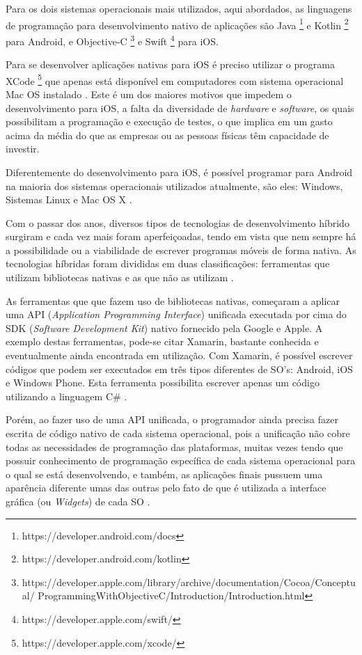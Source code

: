 Para os dois sistemas operacionais mais utilizados, aqui abordados, as linguagens de programação para desenvolvimento nativo de aplicações  são Java \footnote{https://developer.android.com/docs} e Kotlin \footnote{https://developer.android.com/kotlin} para Android, e Objective-C \footnote{https://developer.apple.com/library/archive/documentation/Cocoa/Conceptual/ \newline ProgrammingWithObjectiveC/Introduction/Introduction.html} e Swift \footnote{https://developer.apple.com/swift/} para iOS. 

Para se desenvolver aplicações nativas para iOS é preciso utilizar o programa XCode \footnote{https://developer.apple.com/xcode/} que apenas está disponível em computadores com sistema operacional Mac OS instalado \cite{goadrich2011smart}. Este é um dos maiores motivos que impedem o desenvolvimento para iOS, a falta da diversidade de \textit{hardware} e \textit{software}, os quais possibilitam a programação e execução de testes, o que implica em um gasto acima da média do que as empresas ou as pessoas físicas têm capacidade de investir.

Diferentemente do desenvolvimento para iOS, é possível programar para Android na maioria dos sistemas operacionais utilizados atualmente, são eles: Windows, Sistemas Linux e Mac OS X \cite{goadrich2011smart}. 

Com o passar dos anos, diversos tipos de tecnologias de desenvolvimento híbrido surgiram e cada vez mais foram aperfeiçoadas, tendo em vista que nem sempre há a possibilidade ou a viabilidade de escrever programas móveis de forma nativa.
As tecnologias híbridas foram divididas em duas classificações: ferramentas que utilizam bibliotecas nativas e as que não as utilizam \cite{clow2019flutter}.

As ferramentas que que fazem uso de bibliotecas nativas, começaram a aplicar uma API (\textit{Application Programming Interface}) unificada executada por cima do SDK (\textit{Software Development Kit}) nativo fornecido pela Google e Apple. A exemplo destas ferramentas, pode-se citar Xamarin, bastante conhecida e eventualmente ainda encontrada em utilização. Com Xamarin, é possível escrever códigos que podem ser executados em três tipos diferentes de SO's: Android, iOS e Windows Phone. Esta ferramenta possibilita escrever apenas um código utilizando a linguagem C\# \cite{petzold2015xamarin}.

Porém, ao fazer uso de uma API unificada, o programador ainda precisa fazer escrita de código nativo de cada sistema operacional, pois a unificação não cobre todas as necessidades de programação das plataformas, muitas vezes tendo que possuir conhecimento de programação específica de cada sistema operacional para o qual se está desenvolvendo, e também, as aplicações finais pussuem uma aparência diferente umas das outras pelo fato de que é utilizada a interface gráfica (ou \textit{Widgets}) de cada SO \cite{clow2019flutter}.


